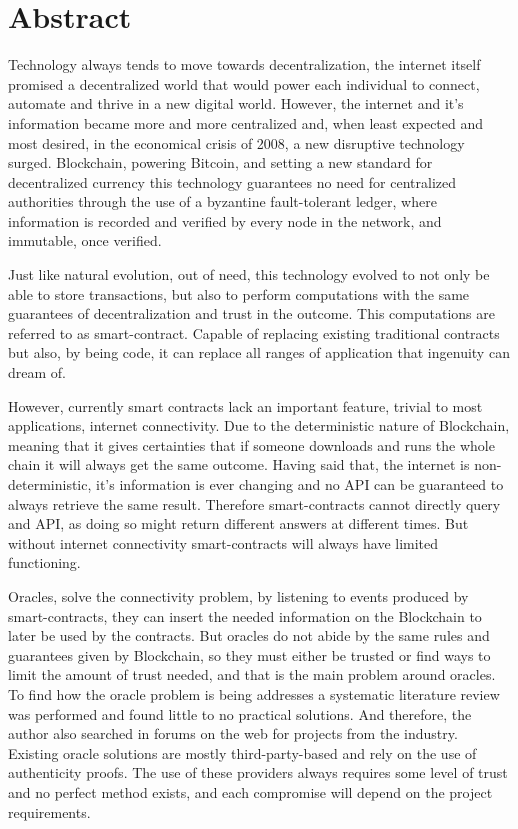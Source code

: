 \chapter*{Abstract}


Technology always tends to move towards decentralization, the internet itself promised a decentralized world that would power each individual to connect, automate and thrive in a new digital world. However, the internet and it's information became more and more centralized and, when least expected and most desired, in the economical crisis of 2008, a new disruptive technology surged. Blockchain, powering Bitcoin, and setting a new standard for decentralized currency this technology guarantees no need for centralized authorities through the use of a byzantine fault-tolerant ledger, where information is recorded and verified by every node in the network, and immutable, once verified.

Just like natural evolution, out of need, this technology evolved to not only be able to store transactions, but also to perform computations with the same guarantees of decentralization and trust in the outcome. This computations are referred to as smart-contract. Capable of replacing existing traditional contracts but also, by being code, it can replace all ranges of application that ingenuity can dream of.

However, currently smart contracts lack an important feature, trivial to most applications, internet connectivity. Due to the deterministic nature of Blockchain, meaning that it gives certainties that if someone downloads and runs the whole chain it will always get the same outcome. Having said that, the internet is non-deterministic, it's information is ever changing and no API can be guaranteed to always retrieve the same result. Therefore smart-contracts cannot directly query and API, as doing so might return different answers at different times. But without internet connectivity smart-contracts will always have limited functioning.

Oracles, solve the connectivity problem, by listening to events produced by smart-contracts, they can insert the needed information on the Blockchain to later be used by the contracts. But oracles do not abide by the same rules and guarantees given by Blockchain, so they must either be trusted or find ways to limit the amount of trust needed, and that is the main problem around oracles. To find how the oracle problem is being addresses a systematic literature review was performed and found little to no practical solutions. And therefore, the author also searched in forums on the web for projects from the industry. Existing oracle solutions are mostly third-party-based and rely on the use of authenticity proofs. The use of these providers always requires some level of trust and no perfect method exists, and each compromise will depend on the project requirements.

